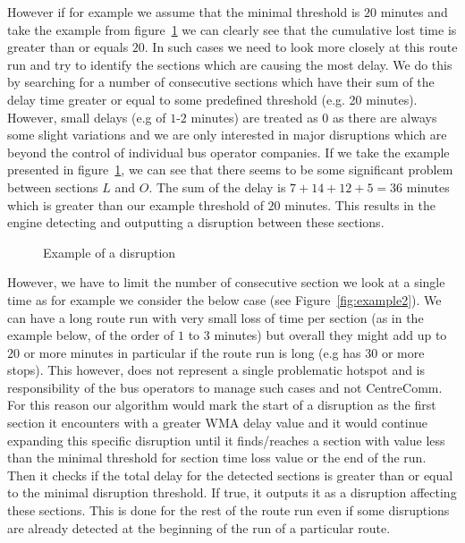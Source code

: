 However if for example we assume that the minimal threshold is $20$ minutes and take the example from figure~\ref{fig:example3} we can clearly see that the cumulative lost time is greater than or equals $20$. In such cases we need to look more closely at this route run and try to identify the sections which are causing the most delay. We do this by searching for a number of consecutive sections which have their sum of the delay time greater or equal to some predefined threshold (e.g. 20 minutes). However, small delays (e.g of $1$-$2$ minutes) are treated as $0$ as there are always some slight variations and we are only interested in major disruptions which are beyond the control of individual bus operator companies. If we take the example presented in figure~\ref{fig:example3}, we can see that there seems to be some significant problem between sections $L$ and $O$. The sum of the delay is $7+14+12+5 = 36$ minutes which is greater than our example threshold of $20$ minutes. This results in the engine detecting and outputting a disruption between these sections.

\begin{figure}[ht]
	\caption{Example of a disruption}
	\label{fig:example3}
\end{figure}

However, we have to limit the number of consecutive section we look at a single time as for example we consider the below case (see Figure~\ref{fig:example2}). We can have a long route run with very small loss of time per section (as in the example below, of the order of $1$ to $3$ minutes) but overall they might add up to $20$ or more minutes in particular if the route run is long (e.g has 30 or more stops). This however, does not represent a single problematic hotspot and is responsibility of the bus operators to manage such cases and not CentreComm. For this reason our algorithm would mark the start of a disruption as the first section it encounters with a greater WMA delay value and it would continue expanding this specific disruption until it finds/reaches a section with value less than the minimal threshold for section time loss value or the end of the run. Then it checks if the total delay for the detected sections is greater than or equal to the minimal disruption threshold. If true, it outputs it as a disruption affecting these sections. This is done for the rest of the route run even if some disruptions are already detected at the beginning of the run of a particular route.

